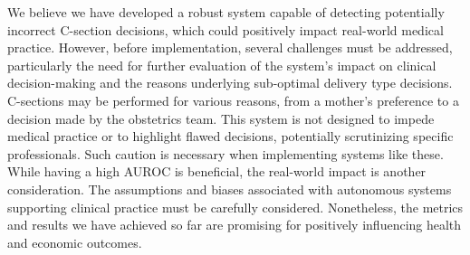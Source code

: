 We believe we have developed a robust system capable of detecting potentially incorrect C-section decisions, which could positively impact real-world medical practice. However, before implementation, several challenges must be addressed, particularly the need for further evaluation of the system's impact on clinical decision-making and the reasons underlying sub-optimal delivery type decisions. C-sections may be performed for various reasons, from a mother's preference to a decision made by the obstetrics team. This system is not designed to impede medical practice or to highlight flawed decisions, potentially scrutinizing specific professionals. Such caution is necessary when implementing systems like these. While having a high AUROC is beneficial, the real-world impact is another consideration. The assumptions and biases associated with autonomous systems supporting clinical practice must be carefully considered. Nonetheless, the metrics and results we have achieved so far are promising for positively influencing health and economic outcomes.